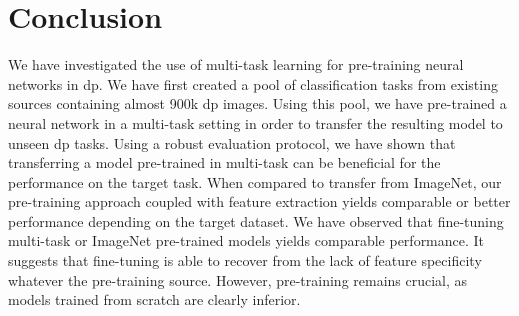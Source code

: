 \section{Conclusion}

We have investigated the use of multi-task learning for pre-training neural networks in \acrlong{dp}. We have first created a pool of classification tasks from existing sources containing almost 900k \acrlong{dp} images. Using this pool, we have pre-trained a neural network in a multi-task setting in order to transfer the resulting model to unseen \acrlong{dp} tasks. Using a robust evaluation protocol, we have shown that transferring a model pre-trained in multi-task can be beneficial for the performance on the target task. When compared to transfer from ImageNet, our pre-training approach coupled with feature extraction yields comparable or better performance depending on the target dataset. We have observed that fine-tuning multi-task or ImageNet pre-trained models yields comparable performance. It suggests that fine-tuning is able to recover from the lack of feature specificity whatever the pre-training source. However, pre-training remains crucial, as models trained from scratch are clearly inferior. 
